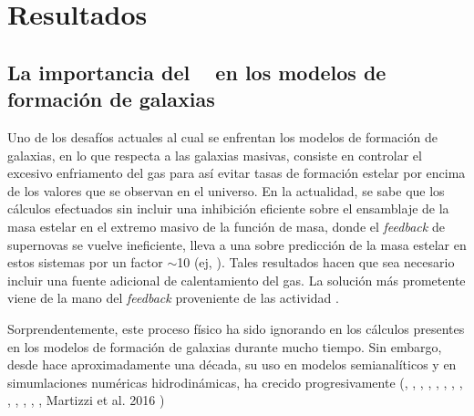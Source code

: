 
\chapter{Resultados} %

\label{ch:resultados} %



\section{La importancia del \agn~ en los modelos de formaci\'on de galaxias}
\label{sec:agnoff}

Uno de los desaf\'ios actuales al cual se enfrentan los modelos de formaci\'on de galaxias, en lo que 
respecta a las galaxias masivas, consiste en controlar el excesivo enfriamento del gas para as\'i evitar tasas 
de formaci\'on estelar por encima de los valores que se observan en el universo. En la actualidad, se sabe que los 
c\'alculos efectuados sin incluir una inhibici\'on eficiente sobre el ensamblaje de la masa estelar en el extremo 
masivo de la funci\'on de masa, donde el \textit{feedback} de supernovas se vuelve ineficiente, 
lleva a una sobre predicci\'on de la masa 
estelar en estos sistemas por un factor $\sim$10 (ej, \cite{ben03}). Tales resultados hacen que sea
necesario incluir una fuente adicional de calentamiento del gas. La soluci\'on m\'as
prometente viene de la mano del \textit{feedback} proveniente de las actividad \agn.


Sorprendentemente, este proceso f\'isico ha sido ignorando en los c\'alculos presentes en los modelos de formaci\'on de galaxias durante
mucho tiempo. Sin embargo, desde hace aproximadamente una d\'ecada, su uso en modelos semianal\'iticos 
y en simumlaciones num\'ericas hidrodin\'amicas, ha crecido progresivamente 
(\cite{gra04}, \cite{spr05}, \cite{bow06}, \cite{crot06}, \cite{mon07}, \cite{sij07}, \cite{som08}, \cite{fab10},
\cite{mcc10}, \cite{mar12}, \cite{rag13}, \cite{bah17}, \cite{pil17}, Martizzi et al. 2016 )

